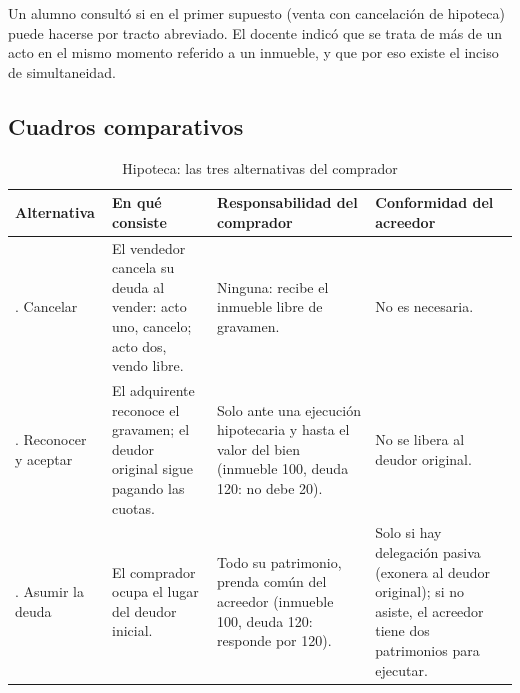 \documentclass[12pt,oneside]{book}
\begin{document}
Un alumno consultó si en el primer supuesto (venta con cancelación de hipoteca) puede hacerse por tracto abreviado. El docente indicó que se trata de más de un acto en el mismo momento referido a un inmueble, y que por eso existe el inciso de simultaneidad. %

\subsection{Cuadros comparativos}

\begin{table}[H]
\centering
\caption{Hipoteca: las tres alternativas del comprador}
\small
\begin{tabularx}{\textwidth}{>{\raggedright\arraybackslash}p{2.6cm}>{\raggedright\arraybackslash}X>{\raggedright\arraybackslash}X>{\raggedright\arraybackslash}X}
\toprule
\textbf{Alternativa} & \textbf{En qué consiste} & \textbf{Responsabilidad del comprador} & \textbf{Conformidad del acreedor} \\
\midrule
1. Cancelar & El vendedor cancela su deuda al vender: acto uno, cancelo; acto dos, vendo libre. & Ninguna: recibe el inmueble libre de gravamen. & No es necesaria. \\
2. Reconocer y aceptar & El adquirente reconoce el gravamen; el deudor original sigue pagando las cuotas. & Solo ante una ejecución hipotecaria y hasta el valor del bien (inmueble 100, deuda 120: no debe 20). & No se libera al deudor original. \\
3. Asumir la deuda & El comprador ocupa el lugar del deudor inicial. & Todo su patrimonio, prenda común del acreedor (inmueble 100, deuda 120: responde por 120). & Solo si hay delegación pasiva (exonera al deudor original); si no asiste, el acreedor tiene dos patrimonios para ejecutar. \\
\bottomrule
\end{tabularx}
\end{table}
\end{document}
